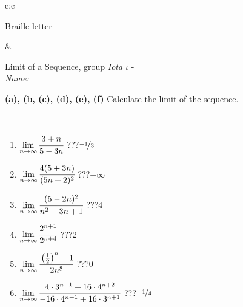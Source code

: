 \documentclass[10pt]{report}
\begin{document}
\begin{tabular}{c:c}
\begin{minipage}[c][104.5mm][t]{0.5\linewidth}
\begin{center}
\begin{minipage}{0.20\linewidth}
\begin{center}
{\small Braille letter}
\end{center}
\end{minipage}
\end{center}
\end{minipage}
&
\begin{minipage}[c][104.5mm][t]{0.5\linewidth}
\begin{center}
\vspace{5mm}
{\huge Limit of a Sequence, group \textit{Iota $\iota$} -}\\[5mm]
\textit{Name:}\phantom{xxxxxxxxxxxxxxxxxxxxxxxxxxxxxxxxxxxxxxxxxxxxxxxxxxxxxxxxxxxxxxxxx}\\[5mm]
\begin{minipage}{0.95\linewidth}
\begin{center}
{
\textbf{(a), (b, (c), (d), (e), (f)} Calculate the limit of the sequence. \\[-1mm]
\phantom{x}
}
\end{center}
\end{minipage}
\\[1mm]
\begin{minipage}{0.79\linewidth}
\begin{center}
\begin{varwidth}{\linewidth}
\setlength{\itemsep}{0pt}
\begin{enumerate}
\normalsize
\item $\lim\limits_{n\to\infty}\cfrac{3+n}{5-3n}$\quad \dotfill\; ???\;\dotfill \quad $\nicefrac{-1}{3}$
\item $\lim\limits_{n\to\infty}\cfrac{4(5+3n)}{(5n+2)^2}$\quad \dotfill\; ???\;\dotfill \quad $-\infty$
\item $\lim\limits_{n\to\infty}\cfrac{(5-2n)^2}{n^2-3n+1}$\quad \dotfill\; ???\;\dotfill \quad $4$
\item $\lim\limits_{n\to\infty}\cfrac{2^{n+1}}{2^{n+4}}$\quad \dotfill\; ???\;\dotfill \quad $2$
\item $\lim\limits_{n\to\infty}\cfrac{\left(\frac{1}{2}\right)^n -1}{2n^{8}}$\quad \dotfill\; ???\;\dotfill \quad $0$
\item $\lim\limits_{n\to\infty}\cfrac{4\cdot 3^{n-1}+16\cdot 4^{n+2}}{-16\cdot 4^{n+1}+16\cdot 3^{n+1}}$\quad \dotfill\; ???\;\dotfill \quad $\nicefrac{-1}{4}$
\end{enumerate}
\end{varwidth}
\end{center}
\end{minipage}
\begin{minipage}{0.20\linewidth}

\end{minipage}
\end{center}
\end{minipage}
\end{tabular}
\end{document}
